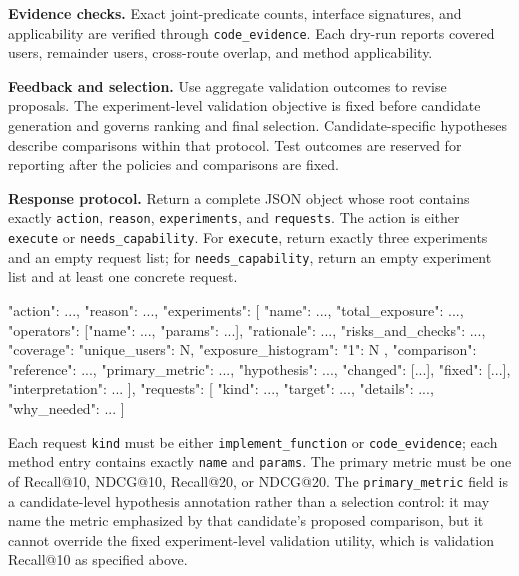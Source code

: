 \noindent\textbf{Evidence checks.}
Exact joint-predicate counts, interface signatures, and applicability are verified through \texttt{code\_evidence}. Each dry-run reports covered users, remainder users, cross-route overlap, and method applicability.

\noindent\textbf{Feedback and selection.}
Use aggregate validation outcomes to revise proposals. The experiment-level validation objective is fixed before candidate generation and governs ranking and final selection. Candidate-specific hypotheses describe comparisons within that protocol. Test outcomes are reserved for reporting after the policies and comparisons are fixed.

\noindent\textbf{Response protocol.}
Return a complete JSON object whose root contains exactly \texttt{action}, \texttt{reason}, \texttt{experiments}, and \texttt{requests}. The action is either \texttt{execute} or \texttt{needs\_capability}. For \texttt{execute}, return exactly three experiments and an empty request list; for \texttt{needs\_capability}, return an empty experiment list and at least one concrete request.

\begin{promptblock}[samepage=true]
{
  "action": ..., "reason": ...,
  "experiments": [{
    "name": ..., "total_exposure": ...,
    "operators": [{"name": ..., "params": ...}],
    "rationale": ..., "risks_and_checks": ...,
    "coverage": {
      "unique_users": N,
      "exposure_histogram": {"1": N}
    },
    "comparison": {
      "reference": ..., "primary_metric": ...,
      "hypothesis": ..., "changed": [...], "fixed": [...],
      "interpretation": ...
    }
  }],
  "requests": [{
    "kind": ..., "target": ...,
    "details": ..., "why_needed": ...
  }]
}
\end{promptblock}
Each request \texttt{kind} must be either \texttt{implement\_function} or \texttt{code\_evidence}; each method entry contains exactly \texttt{name} and \texttt{params}. The primary metric must be one of Recall@10, NDCG@10, Recall@20, or NDCG@20.
The \texttt{primary\_metric} field is a candidate-level hypothesis annotation rather than a selection control: it may name the metric emphasized by that candidate's proposed comparison, but it cannot override the fixed experiment-level validation utility, which is validation Recall@10 as specified above.
\endgroup

